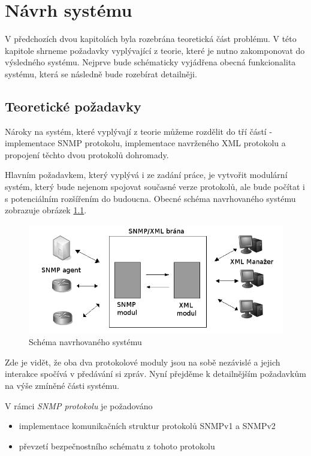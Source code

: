 \chapter{Návrh systému}
\label{kap_navrh_systemu}
V předchozích dvou kapitolách byla rozebrána teoretická část problému. V této kapitole shrneme požadavky vyplývající z teorie, které je nutno zakomponovat do
výsledného systému. Nejprve bude schématicky vyjádřena obecná funkcionalita systému, která se následně bude rozebírat detailněji.

\section{Teoretické požadavky}
Nároky na systém, které vyplývají z teorie můžeme rozdělit do tří částí - implementace SNMP protokolu, implementace navrženého XML protokolu a propojení těchto dvou protokolů dohromady.

Hlavním požadavkem, který vyplývá i ze zadání práce, je vytvořit modulární systém, který bude nejenom spojovat současné verze protokolů, ale bude počítat i s potenciálním rozšířením do
budoucna. Obecné schéma navrhovaného systému zobrazuje obrázek \ref{obr_an_obecne_schema}. 

\begin{figure}[htp]
	\begin{center}
		\includegraphics[width=15cm]{obrazky/04_obecne_schema.png}
		\caption{Schéma navrhovaného systému}
		\label{obr_an_obecne_schema}
	\end{center}
\end{figure}

Zde je vidět, že oba dva protokolové moduly jsou na sobě nezávislé a jejich interakce spočívá v předávání si zpráv. Nyní přejděme k detailnějším požadavkům na výše zmíněné části systému.

V rámci \textit{SNMP protokolu} je požadováno
\begin{itemize}
	\item implementace komunikačních struktur protokolů SNMPv1 a SNMPv2
	\item převzetí bezpečnostního schématu z tohoto protokolu
\end{itemize}


